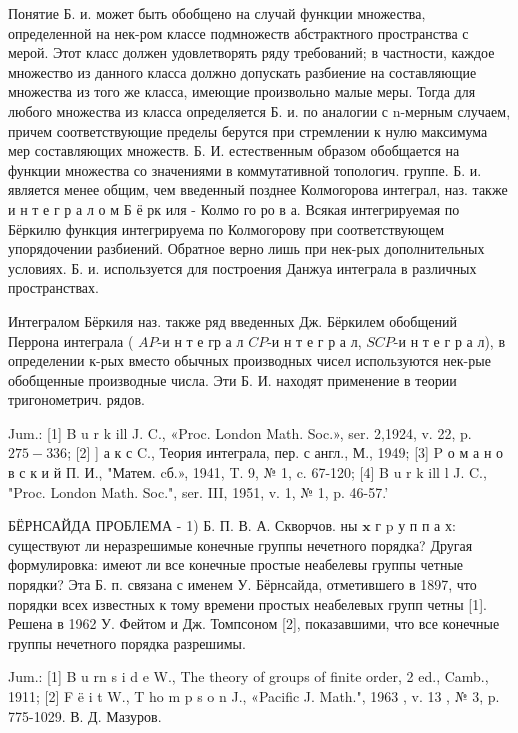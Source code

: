 \documentclass[10pt]{article}
\begin{document}
Понятие Б. и. может быть обобщено на случай функции множества, определенной на нек-ром классе подмножеств абстрактного пространства с мерой. Этот класс должен удовлетворять ряду требований; в частности, каждое множество из данного класса должно допускать разбиение на составляющие множества из того же класса, имеющие произвольно малые меры. Тогда для любого множества из класса определяется Б. и. по аналогии с n-мерным случаем, причем соответствующие пределы берутся при стремлении к нулю максимума мер составляющих множеств. Б. И. естественным образом обобщается на функции множества со значениями в коммутативной топологич. группе. Б. и. является менее общим, чем введенный позднее Колмогорова интеграл, наз. также и н т е г р а л о м Б ё рк иля - Колмо го ро в а. Всякая интегрируемая по Бёркилю функция интегрируема по Колмогорову при соответствующем упорядочении разбиений. Обратное верно лишь при нек-рых дополнительных условиях. Б. и. используется для построения Данжуа интеграла в различных пространствах.



Интегралом Бёркиля наз. также ряд введенных Дж. Бёркилем обобщений Перрона интеграла ( $A P$-и н т е гр а л $C P$-и н т е г р а л, $S C P$-и н т е г р а л), в определении к-рых вместо обычных производных чисел используются нек-рые обобщенные производные числа. Эти Б. И. находят применение в теории тригонометрич. рядов.



Jum.: [1] B u r k ill J. C., «Proc. London Math. Soc.», ser. 2,1924, v. 22, p. $275-336$; [2] ] а к с C., Теория интеграла, пер. с англ., М., 1949; [3] P о м а н о в с к и й П. И., "Матем. cб.», 1941, T. 9, № 1, c. 67-120; [4] B u r k ill l J. C., "Proc. London Math. Soc.", ser. III, 1951, v. 1, № 1, p. 46-57.'



БЁРНСАЙДА ПРОБЛЕМА - 1) Б. П. В. А. Скворчов. ны $\mathbf{x}$ г p у п п а х: существуют ли неразрешимые конечные группы нечетного порядка? Другая формулировка: имеют ли все конечные простые неабелевы группы четные порядки? Эта Б. п. связана с именем У. Бёрнсайда, отметившего в 1897, что порядки всех известных к тому времени простых неабелевых групп четны [1]. Решена в 1962 У. Фейтом и Дж. Томпсоном [2], показавшими, что все конечные группы нечетного порядка разрешимы.



Jum.: [1] B u rn s i d e W., The theory of groups of finite order, 2 ed., Camb., 1911; [2] F ë i t W., T ho m p s o n J., «Pacific J. Math.", 1963 , v. 13 , № 3, p. 775-1029. В. Д. Мазуров.
\end{document}
